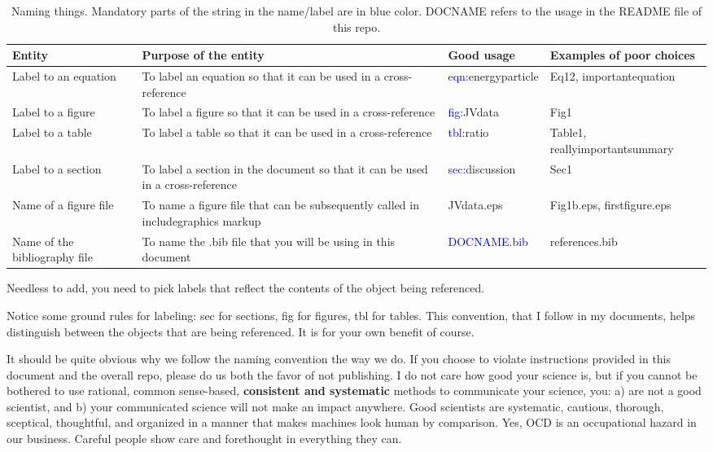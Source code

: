 \documentclass[12pt,twocolumn]{article}
\begin{document}
\scriptsize
\begin{table}
  \centering
  \caption{Naming things. Mandatory parts of the string in the name/label are in blue color. DOCNAME refers to the usage in the README file of this repo.} \label{tbl:namingthings}
  \begin{tabular}{p{1.5cm}p{2.5cm}p{3cm}p{2cm}}
    \hline
    \textbf{Entity}  & \textbf{Purpose of the entity} &  \textbf{Good usage} & \textbf{Examples of poor choices} \\\hline
    Label to an equation & To label an equation so that it can be used in a cross-reference & \textcolor{blue}{eqn:}energyparticle & Eq12, importantequation \\\hline
    Label to a figure & To label a figure so that it can be used in a cross-reference & \textcolor{blue}{fig:}JVdata & Fig1 \\\hline
    Label to a table & To label a table so that it can be used in a cross-reference & \textcolor{blue}{tbl:}ratio & Table1, reallyimportantsummary \\\hline
    Label to a section & To label a section in the document so that it can be used in a cross-reference & \textcolor{blue}{sec:}discussion & Sec1 \\\hline
    Name of a figure file & To name a figure file that can be subsequently called in includegraphics markup & JVdata.eps & Fig1b.eps, firstfigure.eps\\\hline
    Name of the bibliography file & To name the .bib file that you will be using in this document & \textcolor{blue}{DOCNAME.bib} & references.bib \\\hline
  \end{tabular}
\end{table}
\normalsize

Needless to add, you need to pick labels that reflect the contents of the object being referenced.

Notice some ground rules for labeling: sec for sections, fig for figures, tbl for tables. This convention, that I follow in my documents, helps distinguish between the objects that are being referenced. It is for your own benefit of course.

It should be quite obvious why we follow the naming convention the way we do. If you choose to violate instructions provided in this document and the overall repo, please do us both the favor of not publishing. I do not care how good your science is, but if you cannot be bothered to use rational, common sense-based, \textbf{consistent and systematic} methods to communicate your science, you: a) are not a good scientist, and b) your communicated science will not make an impact anywhere. Good scientists are systematic, cautious, thorough, sceptical, thoughtful, and organized in a manner that makes machines look human by comparison. Yes, OCD is an occupational hazard in our business. Careful people show care and forethought in everything they can.
\end{document}
